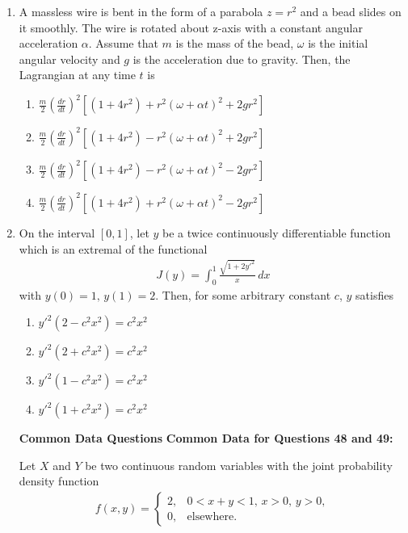 \documentclass[journal]{IEEEtran}
\numberwithin{equation}{enumi}
\numberwithin{figure}{enumi}
\begin{document}
\begin{enumerate}
 

\item A massless wire is bent in the form of a parabola \( z = r^2 \) and a bead slides on it smoothly. The wire is rotated about z-axis with a constant angular acceleration \(\alpha\). Assume that \( m \) is the mass of the bead, \(\omega\) is the initial angular velocity and \( g \) is the acceleration due to gravity. Then, the Lagrangian at any time \( t \) is
   \hfill{}

\begin{enumerate}
    \item $\frac{m}{2} \left( \frac{dr}{dt} \right)^2 \left[ (1+4r^2) + r^2 (\omega + \alpha t)^2 + 2g r^2 \right]$
    \item $\frac{m}{2} \left( \frac{dr}{dt} \right)^2 \left[ (1+4r^2) - r^2 (\omega + \alpha t)^2 + 2g r^2 \right]$
    \item $\frac{m}{2} \left( \frac{dr}{dt} \right)^2 \left[ (1+4r^2) - r^2 (\omega + \alpha t)^2 - 2g r^2 \right]$
    \item $\frac{m}{2} \left( \frac{dr}{dt} \right)^2 \left[ (1+4r^2) + r^2 (\omega + \alpha t)^2 - 2g r^2 \right]$
\end{enumerate}



\item On the interval \([0,1]\), let \( y \) be a twice continuously differentiable function which is an extremal of the functional
\begin{align*}
J(y) = \int_0^1 \frac{\sqrt{1 + 2y'^2}}{x} \, dx
\end{align*}
with \( y(0) = 1, \, y(1) = 2 \). Then, for some arbitrary constant \( c \), \( y \) satisfies
 \hfill{}
\begin{multicols}{2}
\begin{enumerate}
\item  $y'^2 (2 - c^2 x^2 ) = c^2 x^2$
\item $y'^2 (2 + c^2 x^2 ) = c^2 x^2$
\item $y'^2 (1 - c^2 x^2 ) = c^2 x^2$
\item $y'^2 (1 + c^2 x^2 ) = c^2 x^2$
\end{enumerate}
\end{multicols}

\bigskip

\textbf{Common Data Questions}
\newline
\textbf{Common Data for Questions 48 and 49:}

Let $X$ and $Y$ be two continuous random variables with the joint probability density function
\begin{align*}
f(x, y) = 
\begin{cases}
2, & 0 < x + y < 1,\, x > 0,\, y > 0, \\
0, & \text{elsewhere}.
\end{cases}
\end{align*}



\end{enumerate}
\end{document}
